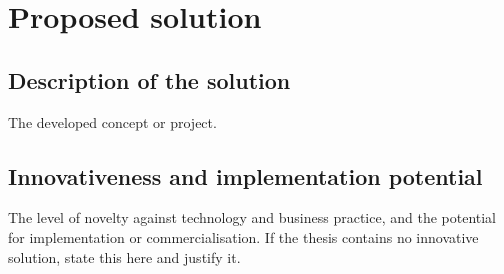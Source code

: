 \chapter{Proposed solution}

\section{Description of the solution}
The developed concept or project.

\section{Innovativeness and implementation potential}
The level of novelty against technology and business practice, and the
potential for implementation or commercialisation. If the thesis contains
no innovative solution, state this here and justify it.
